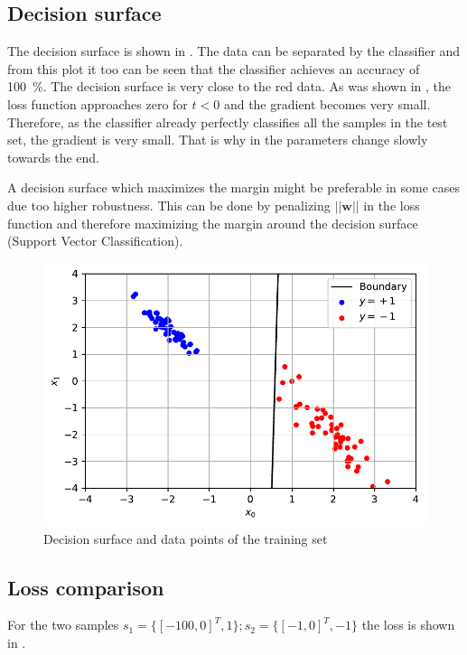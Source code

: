 \documentclass[12pt,a4paper]{scrartcl}
\newcommand{\matr}[1]{\mathbf{#1}}
\begin{document}
	\subsection*{Decision surface}
	
	The decision surface is shown in . The data can be separated by the classifier and from this plot it too can be seen that the classifier achieves an accuracy of \SI{100}{\percent }.
	The decision surface is very close to the red data. 
	As was shown in , the loss function approaches zero for $t < 0$ and the gradient becomes very small. 
	Therefore, as the classifier already perfectly classifies all the samples in the test set, the gradient is very small. That is why in  the parameters change slowly towards the end.	
	
	A decision surface which maximizes the margin might be preferable in some cases due too higher robustness. This can be done by penalizing $||\matr{w}||$ in the loss function and therefore maximizing the margin around the decision surface (Support Vector Classification).
	
	\begin{figure}[H]
		\centering	\includegraphics[width=0.85\linewidth]{figs/ex2_1_boundary.pdf}
		\caption{Decision surface and data points of the training set}
		\label{fig:ex2_1_boundary}
	\end{figure}
	
	\subsection*{Loss comparison}
	
	For the two samples
	$s_1=\{[-100,0]^T, 1\}; s_2=\{[-1, 0]^T, -1\}$ the loss is shown in . 
	
\end{document}
